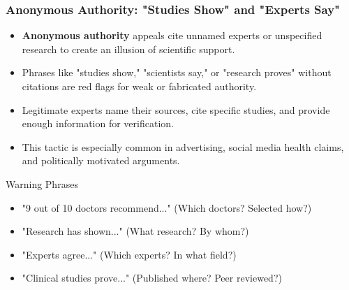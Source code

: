 \documentclass{beamer}
\begin{document}
	\begin{frame}
		\frametitle{Anonymous Authority: "Studies Show" and "Experts Say"}
		\begin{itemize}
			\item \textbf{Anonymous authority} appeals cite unnamed experts or unspecified research to create an illusion of scientific support.
			\item Phrases like "studies show," "scientists say," or "research proves" without citations are red flags for weak or fabricated authority.
			\item Legitimate experts name their sources, cite specific studies, and provide enough information for verification.
			\item This tactic is especially common in advertising, social media health claims, and politically motivated arguments.
		\end{itemize}
		
		\begin{alertblock}{Warning Phrases}
			\begin{itemize}
				\item "9 out of 10 doctors recommend..." (Which doctors? Selected how?)
				\item "Research has shown..." (What research? By whom?)
				\item "Experts agree..." (Which experts? In what field?)
				\item "Clinical studies prove..." (Published where? Peer reviewed?)
			\end{itemize}
		\end{alertblock}
	\end{frame}
	
\end{document}
